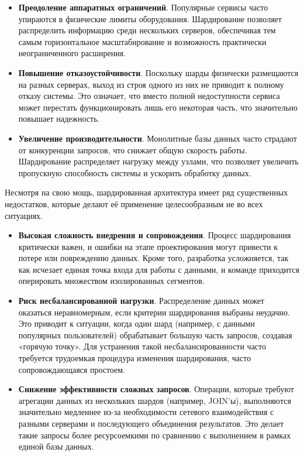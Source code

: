 \begin{itemize}
    \item \textbf{Преодоление аппаратных ограничений}. Популярные сервисы часто
    упираются в физические лимиты оборудования. Шардирование позволяет
    распределить информацию среди нескольких серверов, обеспечивая тем самым
    горизонтальное масштабирование и возможность практически неограниченного
    расширения.

    \item \textbf{Повышение отказоустойчивости}. Поскольку шарды физически
    размещаются на разных серверах, выход из строя одного из них не приводит к
    полному отказу системы. Это означает, что вместо полной недоступности
    сервиса может перестать функционировать лишь его некоторая часть, что
    значительно повышает надежность.

    \item \textbf{Увеличение производительности}. Монолитные базы данных часто
    страдают от конкуренции запросов, что снижает общую скорость работы.
    Шардирование распределяет нагрузку между узлами, что позволяет увеличить
    пропускную способность системы и ускорить обработку данных.
\end{itemize}

Несмотря на свою мощь, шардированная архитектура имеет ряд существенных
недостатков, которые делают её применение целесообразным не во всех ситуациях.

\begin{itemize}
    \item \textbf{Высокая сложность внедрения и сопровождения}. Процесс
    шардирования критически важен, и ошибки на этапе проектирования могут
    привести к потере или повреждению данных. Кроме того, разработка
    усложняется, так как исчезает единая точка входа для работы с данными, и
    команде приходится оперировать множеством изолированных сегментов.

    \item \textbf{Риск несбалансированной нагрузки}. Распределение данных может
    оказаться неравномерным, если критерии шардирования выбраны неудачно.
    Это приводит к ситуации, когда один шард (например, с данными популярных
    пользователей) обрабатывает большую часть запросов, создавая «горячую
    точку». Для устранения такой несбалансированности часто требуется
    трудоемкая процедура изменения шардирования, часто сопровождающаяся простоем.

    \item \textbf{Снижение эффективности сложных запросов}. Операции, которые
    требуют агрегации данных из нескольких шардов (например, JOIN'ы),
    выполняются значительно медленнее из-за необходимости сетевого
    взаимодействия с разными серверами и последующего объединения результатов.
    Это делает такие запросы более ресурсоемкими по сравнению с выполнением в
    рамках единой базы данных.
\end{itemize}

